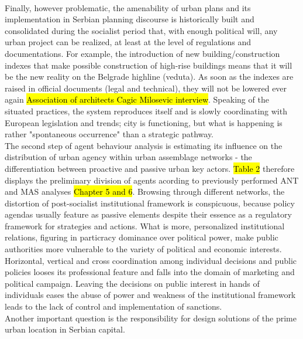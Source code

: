 \documentclass[11pt]{report}
\begin{document}
\\
Finally, however problematic, the amenability of urban plans and its implementation in Serbian planning discourse is historically built and consolidated during the socialist period that, with enough political will, any urban project can be realized, at least at the level of regulations and documentations.
For example, the introduction of new building/construction indexes that make possible construction of high-rise buildings means that it will be the new reality on the Belgrade highline (veduta). As soon as the indexes are raised in official documents (legal and technical), they will not be lowered ever again \hl{Association of architects Cagic Milosevic interview}.
Speaking of the situated practices, the system reproduces itself and is slowly coordinating with European legislation and trends; city is functioning, but what is happening is rather "spontaneous occurrence" than a strategic pathway.
\\
The second step of agent behaviour analysis is estimating its influence on the distribution of urban agency within urban assemblage networks - the differentiation between proactive and passive urban key actors.
\hl{Table 2} therefore displays the preliminary division of agents acording to previously performed ANT and MAS analyses \hl{Chapter 5 and 6}.
Browsing through different networks, the distortion of post-socialist institutional framework is conspicuous, because policy agendas usually feature as passive elements despite their essence as a regulatory framework for strategies and actions.
What is more, personalized institutional relations, figuring in particracy dominance over political power, make public authorities more vulnerable to the variety of political and economic interests.
Horizontal, vertical and cross coordination among individual decisions and public policies looses its professional feature and falls into the domain of marketing and political campaign.
Leaving the decisions on public interest in hands of individuals eases the abuse of power and weakness of the institutional framework leads to the lack of control and implementation of sanctions. 
\\
Another important question is the responsibility for design solutions of the prime urban location in Serbian capital.
\end{document}
